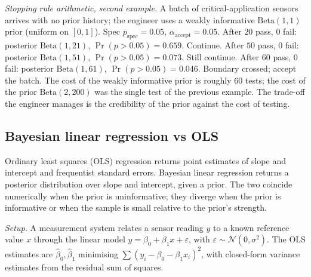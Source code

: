 \textit{Stopping rule arithmetic, second example.} A batch of
critical-application sensors arrives with no prior history; the
engineer uses a weakly informative $\text{Beta}(1, 1)$ prior
(uniform on $[0, 1]$). Spec $p_{\text{spec}} = 0.05$,
$\alpha_{\text{accept}} = 0.05$. After $20$ pass, $0$ fail:
posterior $\text{Beta}(1, 21)$, $\Pr(p > 0.05) = 0.659$. Continue.
After $50$ pass, $0$ fail: posterior $\text{Beta}(1, 51)$,
$\Pr(p > 0.05) = 0.073$. Still continue. After $60$ pass, $0$
fail: posterior $\text{Beta}(1, 61)$, $\Pr(p > 0.05) = 0.046$.
Boundary crossed; accept the batch. The cost of the weakly
informative prior is roughly $60$ tests; the cost of the prior
$\text{Beta}(2, 200)$ was the single test of the previous example.
The trade-off the engineer manages is the credibility of the
prior against the cost of testing.

\subsection{Bayesian linear regression vs OLS}

Ordinary least squares (OLS) regression returns point estimates of
slope and intercept and frequentist standard errors. Bayesian
linear regression returns a posterior distribution over slope and
intercept, given a prior. The two coincide numerically when the
prior is uninformative; they diverge when the prior is informative
or when the sample is small relative to the prior's strength.

\textit{Setup.} A measurement system relates a sensor reading $y$
to a known reference value $x$ through the linear model
$y = \beta_{0} + \beta_{1} x + \varepsilon$, with $\varepsilon
\sim \mathcal{N}(0, \sigma^{2})$. The OLS estimates are
$\hat{\beta}_{0}, \hat{\beta}_{1}$ minimising $\sum (y_{i} -
\beta_{0} - \beta_{1} x_{i})^{2}$, with closed-form variance
estimates from the residual sum of squares.

